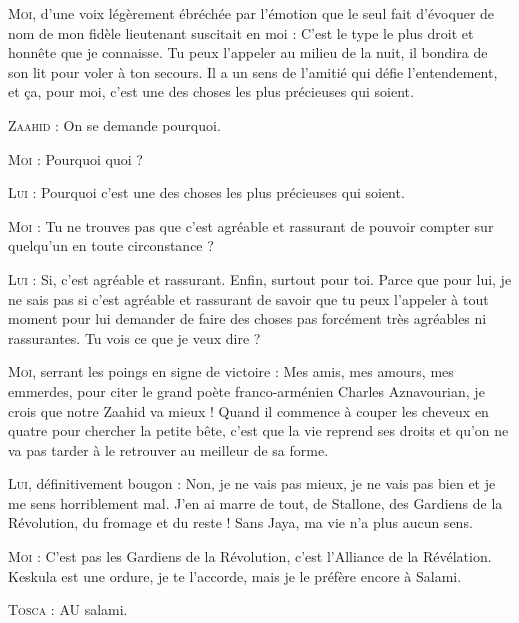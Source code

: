 \begin{dialogue}
\textsc{Moi}, d’une voix légèrement ébréchée par l’émotion que le seul fait d’évoquer de nom de mon fidèle lieutenant suscitait en moi : C’est le type le plus droit et honnête que je connaisse. Tu peux l’appeler au milieu de la nuit, il bondira de son lit pour voler à ton secours. Il a un sens de l’amitié qui défie l’entendement, et ça, pour moi, c’est une des choses les plus précieuses qui soient.

\textsc{Zaahid} : On se demande pourquoi.

\textsc{Moi} : Pourquoi quoi ?

\textsc{Lui} : Pourquoi c’est une des choses les plus précieuses qui soient.

\textsc{Moi} : Tu ne trouves pas que c’est agréable et rassurant de pouvoir compter sur quelqu’un en toute circonstance ?

\textsc{Lui} : Si, c’est agréable et rassurant. Enfin, surtout pour toi. Parce que pour lui, je ne sais pas si c’est agréable et rassurant de savoir que tu peux l’appeler à tout moment pour lui demander de faire des choses pas forcément très agréables ni rassurantes. Tu vois ce que je veux dire ?

\textsc{Moi}, serrant les poings en signe de victoire : Mes amis, mes amours, mes emmerdes, pour citer le grand poète franco-arménien Charles Aznavourian, je crois que notre Zaahid va mieux ! Quand il commence à couper les cheveux en quatre pour chercher la petite bête, c’est que la vie reprend ses droits et qu’on ne va pas tarder à le retrouver au meilleur de sa forme.

\textsc{Lui}, définitivement bougon : Non, je ne vais pas mieux, je ne vais pas bien et je me sens horriblement mal. J’en ai marre de tout, de Stallone, des Gardiens de la Révolution, du fromage et du reste ! Sans Jaya, ma vie n’a plus aucun sens.

\textsc{Moi} : C’est pas les Gardiens de la Révolution, c’est l’Alliance de la Révélation. Keskula est une ordure, je te l’accorde, mais je le préfère encore à Salami.

%
%
%
\textsc{Tosca} : AU salami.


\end{dialogue}
